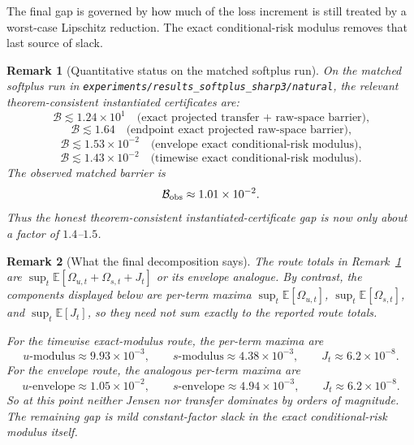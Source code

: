 \documentclass[11pt]{article}
\newtheorem{remark}{Remark}
\newcommand{\E}{\mathbb{E}}
\newcommand{\cB}{\mathcal{B}}
\begin{document}
The final gap is governed by how much of the loss increment is still treated by
a worst-case Lipschitz reduction. The exact conditional-risk modulus removes
that last source of slack.

\begin{remark}[Quantitative status on the matched softplus run]
\label{rem:quantitative-status}
On the matched softplus run in
\texttt{experiments/results\_softplus\_sharp3/natural}, the relevant
theorem-consistent instantiated certificates are:
\[
  \cB \lesssim 1.24\times 10^1
  \quad\text{(exact projected transfer + raw-space barrier),}
\]
\[
  \cB \lesssim 1.64
  \quad\text{(endpoint exact projected raw-space barrier),}
\]
\[
  \cB \lesssim 1.53\times 10^{-2}
  \quad\text{(envelope exact conditional-risk modulus),}
\]
\[
  \cB \lesssim 1.43\times 10^{-2}
  \quad\text{(timewise exact conditional-risk modulus).}
\]
The observed matched barrier is
\[
  \cB_{\rm obs}\approx 1.01\times 10^{-2}.
\]
Thus the honest theorem-consistent instantiated-certificate gap is now only
about a factor of $1.4$--$1.5$.
\end{remark}

\begin{remark}[What the final decomposition says]
The route totals in Remark~\ref{rem:quantitative-status} are
$\sup_t\E[\Omega_{u,t}+\Omega_{s,t}+J_t]$ or its envelope analogue. By
contrast, the components displayed below are per-term maxima
$\sup_t\E[\Omega_{u,t}]$, $\sup_t\E[\Omega_{s,t}]$, and $\sup_t\E[J_t]$, so
they need not sum exactly to the reported route totals.

For the timewise exact-modulus route, the per-term maxima are
\[
  \text{$u$-modulus}\approx 9.93\times 10^{-3},
  \qquad
  \text{$s$-modulus}\approx 4.38\times 10^{-3},
  \qquad
  J_t\approx 6.2\times 10^{-8}.
\]
For the envelope route, the analogous per-term maxima are
\[
  \text{$u$-envelope}\approx 1.05\times 10^{-2},
  \qquad
  \text{$s$-envelope}\approx 4.94\times 10^{-3},
  \qquad
  J_t\approx 6.2\times 10^{-8}.
\]
So at this point neither Jensen nor transfer dominates by orders of magnitude.
The remaining gap is mild constant-factor slack in the exact conditional-risk
modulus itself.
\end{remark}
\end{document}
